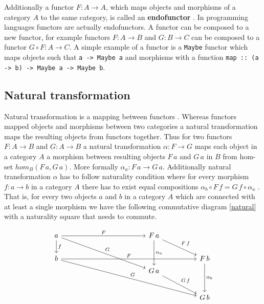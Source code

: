 \documentclass[article]{aaltoseries}
\begin{document}
    Additionally a functor $F: A \rightarrow A$, which maps objects and
    morphisms of a category $A$ to the same category, is called an
    \textbf{endofunctor} \cite{barr1990category, computational}. In programming
    languages functors are actually endofunctors. A functor can be composed to a
    new functor, for example functors $F: A \rightarrow B$ and $G: B \rightarrow
    C$ can be composed to a functor $G \circ F: A \rightarrow C$. A simple
    example of a functor is a \lstinline|Maybe| functor which maps objects such
    that \lstinline|a -> Maybe a| and morphisms with a function
    \lstinline|map :: (a -> b) -> Maybe a -> Maybe b|.


  \subsection{Natural transformation}
    Natural transformation is a mapping between functors \cite{barr1990category,
      mac2013categories, computational}. Whereas functors mapped objects and
    morphisms between two categories a natural transformation maps the resulting
    objects from functors together. Thus for two functors $F: A
    \rightarrow B$ and $G: A \rightarrow B$ a natural transformation
    $\alpha: F \rightarrow G$ maps each object in a category $A$ a morphism
    between resulting objects $F\, a$ and $G\, a$ in $B$ from hom-set $hom_B(F\, a,
    G\, a)$. More formally $\alpha_a: F\, a \rightarrow G\, a$. Additionally
    natural transformation $\alpha$ has to follow naturality condition where for
    every morphism $f: a \rightarrow b$ in a category $A$ there has to exist equal
    compositions $\alpha_b \circ F\, f = G\, f \circ \alpha_a$
    \cite{barr1990category, eilenberg1945general, computational}. That is, for
    every two objects $a$ and $b$ in a category $A$ which are connected with at
    least a single morphism we have the following commutative diagram
    \ref{natural} with a naturality square that needs to commute.
    
    \begin{equation}
      \label{natural}
      \begin{tikzcd}[column sep=huge]
        a \arrow[r, "F"] \arrow[d, "f"] \arrow[ddr, "G"]
        &[7em] F\, a \arrow[dd, "\alpha_a"] \arrow[dr, "F\, f"]
        & \\
        b \arrow[rr, "F"] \arrow[ddrr, "G"]
        &
        & F\, b \arrow[dd, "\alpha_b"] \\
        [-1.5em]
        & G\, a \arrow[dr, "G\, f"]
        & \\
        [0.5em]
        &
        & G\, b \\
      \end{tikzcd}
    \end{equation}
\end{document}
